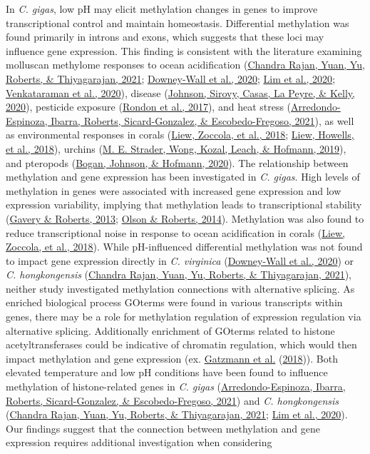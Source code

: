 \documentclass [11pt, proquest] {uwthesis}[2015/03/03]
\begin{document}
In \emph{C. gigas}, low pH may elicit methylation changes in genes to improve transcriptional control and maintain homeostasis. Differential methylation was found primarily in introns and exons, which suggests that these loci may influence gene expression. This finding is consistent with the literature examining molluscan methylome responses to ocean acidification (\protect\hyperlink{ref-ChandraRajan2021}{Chandra Rajan, Yuan, Yu, Roberts, \& Thiyagarajan, 2021}; \protect\hyperlink{ref-Downey-Wall2020}{Downey-Wall et al., 2020}; \protect\hyperlink{ref-Lim2020}{Lim et al., 2020}; \protect\hyperlink{ref-Venkataraman2020}{Venkataraman et al., 2020}), disease (\protect\hyperlink{ref-Johnson2020}{Johnson, Sirovy, Casas, La Peyre, \& Kelly, 2020}), pesticide exposure (\protect\hyperlink{ref-Rondon2017}{Rondon et al., 2017}), and heat stress (\protect\hyperlink{ref-Arredondo-Espinoza2021}{Arredondo-Espinoza, Ibarra, Roberts, Sicard-Gonzalez, \& Escobedo-Fregoso, 2021}), as well as environmental responses in corals (\protect\hyperlink{ref-Liew2018b}{Liew, Zoccola, et al., 2018}; \protect\hyperlink{ref-Liew2018a}{Liew, Howells, et al., 2018}), urchins (\protect\hyperlink{ref-Strader2019}{M. E. Strader, Wong, Kozal, Leach, \& Hofmann, 2019}), and pteropods (\protect\hyperlink{ref-Bogan2020}{Bogan, Johnson, \& Hofmann, 2020}). The relationship between methylation and gene expression has been investigated in \emph{C. gigas}. High levels of methylation in genes were associated with increased gene expression and low expression variability, implying that methylation leads to transcriptional stability (\protect\hyperlink{ref-Gavery2013}{Gavery \& Roberts, 2013}; \protect\hyperlink{ref-Olson2014}{Olson \& Roberts, 2014}). Methylation was also found to reduce transcriptional noise in response to ocean acidification in corals (\protect\hyperlink{ref-Liew2018b}{Liew, Zoccola, et al., 2018}). While pH-influenced differential methylation was not found to impact gene expression directly in \emph{C. virginica} (\protect\hyperlink{ref-Downey-Wall2020}{Downey-Wall et al., 2020}) or \emph{C. hongkongensis} (\protect\hyperlink{ref-ChandraRajan2021}{Chandra Rajan, Yuan, Yu, Roberts, \& Thiyagarajan, 2021}), neither study investigated methylation connections with alternative splicing. As enriched biological process GOterms were found in various transcripts within genes, there may be a role for methylation regulation of expression regulation via alternative splicing. Additionally enrichment of GOterms related to histone acetyltransferases could be indicative of chromatin regulation, which would then impact methylation and gene expression (ex. \protect\hyperlink{ref-Gatzmann2018}{Gatzmann et al.} (\protect\hyperlink{ref-Gatzmann2018}{2018})). Both elevated temperature and low pH conditions have been found to influence methylation of histone-related genes in \emph{C. gigas} (\protect\hyperlink{ref-Arredondo-Espinoza2021}{Arredondo-Espinoza, Ibarra, Roberts, Sicard-Gonzalez, \& Escobedo-Fregoso, 2021}) and \emph{C. hongkongensis} (\protect\hyperlink{ref-ChandraRajan2021}{Chandra Rajan, Yuan, Yu, Roberts, \& Thiyagarajan, 2021}; \protect\hyperlink{ref-Lim2020}{Lim et al., 2020}). Our findings suggest that the connection between methylation and gene expression requires additional investigation when considering 
\end{document}
